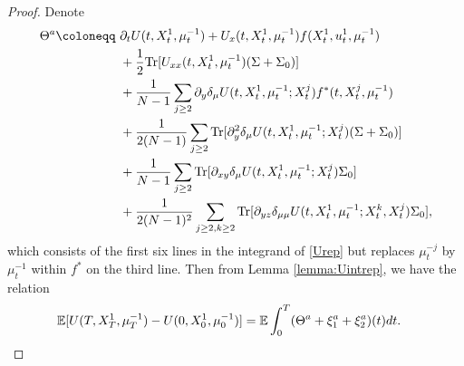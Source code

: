 \documentclass{amsart}
\theoremstyle{definition}
\theoremstyle{remark}
\def\EE{{\mathbb E}}
\numberwithin{equation}{section}
\begin{document}
\begin{proof}
Denote
\begin{align*}
\Theta^a \coloneqq \ &\partial_t U(t, X^1_t, \mu_t^{-1}) + U_{x}(t, X^1_t, \mu_t^{-1}) f(X_t^1, u^1_t, \mu_t^{-1})  \\
& +\frac{1}{2} {\rm Tr}[ U_{xx}(t, X^1_t, \mu_t^{-1}) (\Sigma +\Sigma_0) ]\\
&+ \frac{1}{N-1}\sum_{j\ge 2} \partial_{y}\delta_\mu U(t, X^1_t,\mu_t^{-1}; X^j_t)f^*(t, X_t^j, \mu_t^{-1})  \\
& + \frac{1}{2(N-1)}\sum_{j\ge 2 }{\rm Tr}[ \partial_{y}^2\delta_\mu U(t, X^1_t,\mu_t^{-1}; X^j_t)(\Sigma+\Sigma_0 )] \\
&  + \frac{1}{N-1}\sum_{j\ge 2  }{\rm Tr}[ \partial_{xy}\delta_\mu U(t, X^1_t,\mu_t^{-1}; X^j_t)\Sigma_0 ]\\
&+   \frac{1}{2(N-1)^2}\sum_{j\ge 2,k\ge 2  } {\rm Tr}[\partial_{yz}
\delta_{\mu\mu}
U(t, X^1_t,\mu_t^{-1};X_t^k, X^j_t)\Sigma_0 ], \notag
\end{align*}
which consists of the first six lines  in the integrand of \eqref{Urep} but   replaces $\mu_t^{-j}$  by $\mu_t^{-1}$ within $f^*$ on the third line.
Then from Lemma \ref{lemma:Uintrep}, we have the relation
\begin{align}
&\EE [U(T, X_T^1, \mu_T^{-1})  - U(0, X_0^1, \mu_0^{-1} )] = \EE \int_0^T (\Theta^a +\xi^a_1+\xi^a_2)(t)  dt. \notag
\end{align}



\end{proof}
\end{document}
